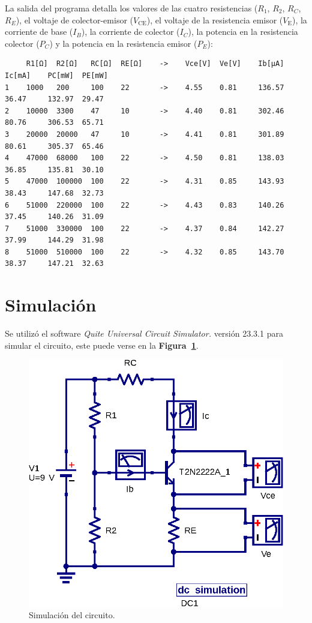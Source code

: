 \documentclass[letter,twoside,11pt]{article}
\begin{document}
La salida del programa detalla los valores de las cuatro resistencias ($R_1$,
$R_2$, $R_C$, $R_E$), el voltaje de colector-emisor ($V_{\text{CE}}$), el
voltaje de la resistencia emisor ($V_{\text{E}}$), la corriente de base ($I_B$),
la corriente de colector ($I_C$), la potencia en la resistencia colector ($P_C$)
y la potencia en la resistencia emisor ($P_E$):
\footnotesize
\begin{shaded}
\begin{verbatim}
     R1[Ω]  R2[Ω]   RC[Ω]  RE[Ω]    ->    Vce[V]  Ve[V]    Ib[µA]  Ic[mA]    PC[mW]  PE[mW]
1    1000   200     100    22       ->    4.55    0.81     136.57  36.47     132.97  29.47
2    10000  3300    47     10       ->    4.40    0.81     302.46  80.76     306.53  65.71
3    20000  20000   47     10       ->    4.41    0.81     301.89  80.61     305.37  65.46
4    47000  68000   100    22       ->    4.50    0.81     138.03  36.85     135.81  30.10
5    47000  100000  100    22       ->    4.31    0.85     143.93  38.43     147.68  32.73
6    51000  220000  100    22       ->    4.43    0.83     140.26  37.45     140.26  31.09
7    51000  330000  100    22       ->    4.37    0.84     142.27  37.99     144.29  31.98
8    51000  510000  100    22       ->    4.32    0.85     143.70  38.37     147.21  32.63
\end{verbatim}
\end{shaded}
\normalsize

\section{Simulación}
Se utilizó el software \emph{Quite Universal Circuit Simulator.} versión 23.3.1
para simular el circuito, este puede verse en la
\textbf{Figura~\ref{simulacion1}}.

\begin{figure}[!h]
\centering
\includegraphics[scale=1.0]{simulacion/npm3.eps}
\caption{Simulación del circuito.}
\label{simulacion1}
\end{figure}
\end{document}
